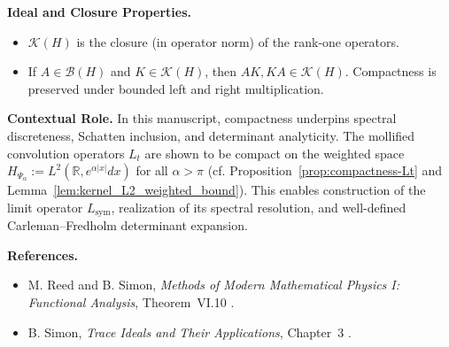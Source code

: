 \begin{definition}
\medskip
\noindent\textbf{Ideal and Closure Properties.}
\begin{itemize}
    \item \( \mathcal{K}(H) \) is the closure (in operator norm) of the rank-one operators.
    \item If \( A \in \mathcal{B}(H) \) and \( K \in \mathcal{K}(H) \), then \( AK, KA \in \mathcal{K}(H) \). Compactness is preserved under bounded left and right multiplication.
\end{itemize}

\medskip
\noindent\textbf{Contextual Role.}
In this manuscript, compactness underpins spectral discreteness, Schatten inclusion, and determinant analyticity. The mollified convolution operators \( L_t \) are shown to be compact on the weighted space \( H_{\Psi_\alpha} := L^2(\mathbb{R}, e^{\alpha|x|} dx) \) for all \( \alpha > \pi \) (cf. Proposition~\ref{prop:compactness-Lt} and Lemma~\ref{lem:kernel_L2_weighted_bound}). This enables construction of the limit operator \( L_{\mathrm{sym}} \), realization of its spectral resolution, and well-defined Carleman–Fredholm determinant expansion.

\medskip
\noindent\textbf{References.}
\begin{itemize}
    \item M. Reed and B. Simon, \emph{Methods of Modern Mathematical Physics I: Functional Analysis}, Theorem~VI.10 \cite{ReedSimon1980I}.
    \item B. Simon, \emph{Trace Ideals and Their Applications}, Chapter~3 \cite{Simon2005TraceIdeals}.
\end{itemize}
\end{definition}
